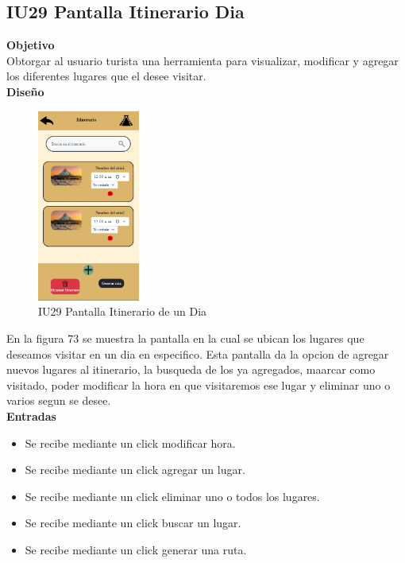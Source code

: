 \subsection{\textbf{IU29 Pantalla Itinerario Dia}}
\textbf{Objetivo}\\
Obtorgar al usuario turista una herramienta para visualizar, modificar y agregar los diferentes lugares que el desee visitar.\\
\vspace{15pt}
\textbf{Diseño}\\
\begin{figure}[htbp]
    \centering 
    \includegraphics[width=0.3\textwidth]{entregable final/pantallasSistema/IU29 Pantalla Itinerario de un Dia.png}
    \caption{IU29 Pantalla Itinerario de un Dia}
    \label{fig:Pantalla de itinerarios} 
\end{figure}

En la figura 73 se muestra la pantalla en la cual se ubican los lugares que deseamos visitar en un dia en especifico. Esta pantalla da la opcion de agregar nuevos lugares al itinerario, la busqueda de los ya agregados, maarcar como visitado, poder modificar la hora en que visitaremos ese lugar y eliminar uno o varios segun se desee.\\

\textbf{Entradas}
\begin{itemize}
    \item Se recibe mediante un click modificar hora.
     \item Se recibe mediante un click agregar un lugar.
 \item Se recibe mediante un click eliminar uno o todos los lugares.
 \item Se recibe mediante un click buscar un lugar. 
 \item Se recibe mediante un click generar una ruta.
\end{itemize}

